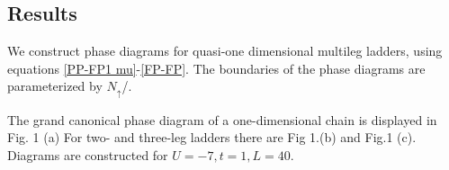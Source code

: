 \documentclass[a0,portrait]{a0poster}
\begin{document}
\begin{multicols}{2}




\section*{Results}
  

We construct phase diagrams for quasi-one dimensional multileg ladders, using equations \eqref{PP-FP1 mu}-\eqref{FP-FP}. The boundaries of the phase diagrams are parameterized by $N_{\uparrow}$/.

The grand canonical phase diagram of a one-dimensional chain is displayed in Fig. 1 (a) For two- and three-leg ladders there are Fig 1.(b) and Fig.1 (c). Diagrams are constructed for $U = -7, t = 1, L = 40$.





\end{multicols}
\end{document}
